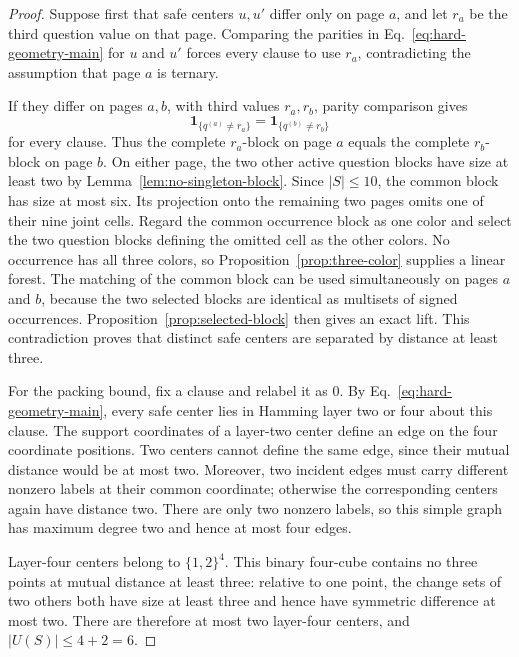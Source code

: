 \documentclass[11pt]{article}
\theoremstyle{definition}
\theoremstyle{remark}
\newcommand{\one}{\mathbf{1}}
\newcommand{\card}[1]{\lvert #1\rvert}
\numberwithin{equation}{section}
\begin{document}
\begin{proof}
Suppose first that safe centers \(u,u'\) differ only on page \(a\), and let
\(r_a\) be the third question value on that page.  Comparing the parities in
Eq.~\eqref{eq:hard-geometry-main} for \(u\) and \(u'\) forces every clause to
use \(r_a\), contradicting the assumption that page \(a\) is ternary.

If they differ on pages \(a,b\), with third values \(r_a,r_b\), parity
comparison gives
\[
  \one_{\{q^{(a)}\neq r_a\}}
  =
  \one_{\{q^{(b)}\neq r_b\}}
\]
for every clause.  Thus the complete \(r_a\)-block on page \(a\) equals the
complete \(r_b\)-block on page \(b\).  On either page, the two other active
question blocks have size at least two by
Lemma~\ref{lem:no-singleton-block}.  Since \(\card S\leq10\), the common block
has size at most six.  Its projection onto the remaining two pages omits one
of their nine joint cells.  Regard the common occurrence block as one color
and select the two question blocks defining the omitted cell as the other
colors.  No occurrence has all three colors, so
Proposition~\ref{prop:three-color} supplies a linear forest.  The matching of
the common block can be used simultaneously on pages \(a\) and \(b\), because
the two selected blocks are identical as multisets of signed occurrences.
Proposition~\ref{prop:selected-block} then gives an exact lift.  This
contradiction proves that distinct safe centers are separated by distance at
least three.

For the packing bound, fix a clause and relabel it as \(0\).  By
Eq.~\eqref{eq:hard-geometry-main}, every safe center lies in Hamming layer two
or four about this clause.  The support coordinates of a layer-two center
define an edge on the four coordinate positions.  Two centers cannot define
the same edge, since their mutual distance would be at most two.  Moreover,
two incident edges must carry different nonzero labels at their common
coordinate; otherwise the corresponding centers again have distance two.
There are only two nonzero labels, so this simple graph has maximum degree two
and hence at most four edges.

Layer-four centers belong to \(\{1,2\}^4\).  This binary four-cube contains no
three points at mutual distance at least three: relative to one point, the
change sets of two others both have size at least three and hence have
symmetric difference at most two.  There are therefore at most two
layer-four centers, and \(\card{U(S)}\leq4+2=6\).
\end{proof}
\end{document}
